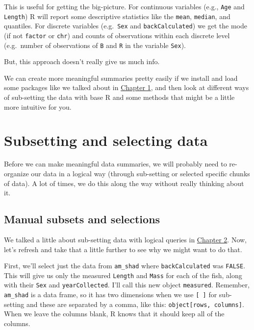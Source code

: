 \documentclass[
]{book}
\begin{document}
This is useful for getting the big-picture. For continuous variables (e.g., \texttt{Age} and \texttt{Length}) R will report some descriptive statistics like the \texttt{mean}, \texttt{median}, and quantiles. For discrete variables (e.g.~\texttt{Sex} and \texttt{backCalculated}) we get the mode (if not \texttt{factor} or \texttt{chr}) and counts of observations within each discrete level (e.g.~number of observations of \texttt{B} and \texttt{R} in the variable \texttt{Sex}).

But, this approach doesn't really give us much info.

We can create more meaningful summaries pretty easily if we install and load some packages like we talked about in \protect\hyperlink{Chapter1}{Chapter 1}, and then look at different ways of sub-setting the data with base R and some methods that might be a little more intuitive for you.

\hypertarget{subsetting-and-selecting-data}{%
\section{Subsetting and selecting data}\label{subsetting-and-selecting-data}}

Before we can make meaningful data summaries, we will probably need to re-organize our data in a logical way (through sub-setting or selected specific chunks of data). A lot of times, we do this along the way without really thinking about it.

\hypertarget{manual-subsets-and-selections}{%
\subsection{Manual subsets and selections}\label{manual-subsets-and-selections}}

We talked a little about sub-setting data with logical queries in \protect\hyperlink{Chapter2}{Chapter 2}. Now, let's refresh and take that a little further to see why we might want to do that.

First, we'll select just the data from \texttt{am\_shad} where \texttt{backCalculated} was \texttt{FALSE}. This will give us only the measured \texttt{Length} and \texttt{Mass} for each of the fish, along with their \texttt{Sex} and \texttt{yearCollected}. I'll call this new object \texttt{measured}. Remember, \texttt{am\_shad} is a data frame, so it has two dimensions when we use \texttt{{[}\ {]}} for sub-setting and these are separated by a comma, like this: \texttt{object{[}rows,\ columns{]}}. When we leave the columns blank, R knows that it should keep all of the columns.
\end{document}
